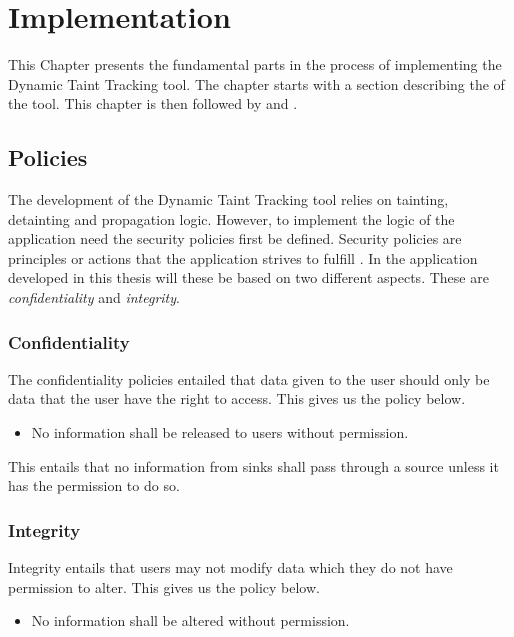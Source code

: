 \chapter{Implementation}
This Chapter presents the fundamental parts in the process of implementing the Dynamic Taint Tracking tool. The chapter starts with a section describing the \textit{} of the tool. This chapter is then followed by \textit{} and \textit{}.



\section{Policies}
\label{Policies}
The development of the Dynamic Taint Tracking tool relies on tainting, detainting and propagation logic. However, to implement the logic of the application need the security policies first be defined. Security policies are principles or actions that the application strives to fulfill \parencite{BayukJenniferL2012Cspg}. In the application developed in this thesis will these be based on two different aspects. These are \textit{confidentiality} and \textit{integrity}.



\subsection{Confidentiality}
The confidentiality policies entailed that data given to the user should only be data that the user have the right to access. This gives us the policy below.

\hfill
\begin{itemize}
    \item No information shall be released to users without permission.
\end{itemize}
\hfill

This entails that no information from sinks shall pass through a source unless it has the permission to do so.


\subsection{Integrity}
Integrity entails that users may not modify data which they do not have permission to alter. This gives us the policy below.

\hfill
\begin{itemize}
    \item No information shall be altered without permission.
\end{itemize}
\hfill

